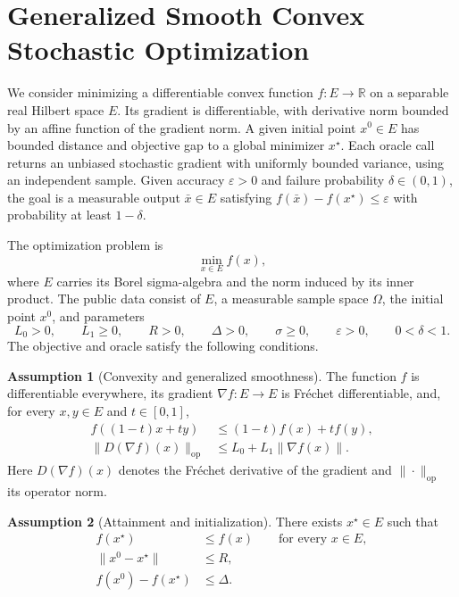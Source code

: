 \documentclass[10pt]{article}
\theoremstyle{definition}
\newtheorem{assumption}{Assumption}
\begin{document}
\section*{Generalized Smooth Convex Stochastic Optimization}
We consider minimizing a differentiable convex function $f:E\to\mathbb{R}$ on a separable real Hilbert space $E$. Its gradient is differentiable, with derivative norm bounded by an affine function of the gradient norm. A given initial point $x^0\in E$ has bounded distance and objective gap to a global minimizer $x^\star$. Each oracle call returns an unbiased stochastic gradient with uniformly bounded variance, using an independent sample. Given accuracy $\varepsilon>0$ and failure probability $\delta\in(0,1)$, the goal is a measurable output $\bar{x}\in E$ satisfying $f(\bar{x})-f(x^\star)\leq\varepsilon$ with probability at least $1-\delta$.

The optimization problem is
\[
\min_{x\in E} f(x),
\]
where $E$ carries its Borel sigma-algebra and the norm induced by its inner product. The public data consist of $E$, a measurable sample space $\Omega$, the initial point $x^0$, and parameters
\[
L_0>0,\qquad L_1\geq0,\qquad R>0,\qquad \Delta>0,
\qquad \sigma\geq0,\qquad \varepsilon>0,\qquad 0<\delta<1.
\]
The objective and oracle satisfy the following conditions.

\begin{assumption}[Convexity and generalized smoothness]
The function $f$ is differentiable everywhere, its gradient $\nabla f:E\to E$ is Fr\'echet differentiable, and, for every $x,y\in E$ and $t\in[0,1]$,
\begin{align*}
f((1-t)x+ty) &\leq (1-t)f(x)+tf(y),\\
\|D(\nabla f)(x)\|_{\mathrm{op}}
&\leq L_0+L_1\|\nabla f(x)\|.
\end{align*}
Here $D(\nabla f)(x)$ denotes the Fr\'echet derivative of the gradient and $\|\cdot\|_{\mathrm{op}}$ its operator norm.
\end{assumption}

\begin{assumption}[Attainment and initialization]
There exists $x^\star\in E$ such that
\begin{align*}
f(x^\star)&\leq f(x)\qquad\text{for every }x\in E,\\
\|x^0-x^\star\|&\leq R,\\
f(x^0)-f(x^\star)&\leq\Delta.
\end{align*}
\end{assumption}
\end{document}
